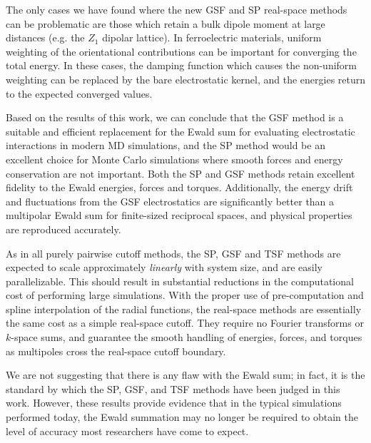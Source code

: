 The only cases we have found where the new GSF and SP real-space
methods can be problematic are those which retain a bulk dipole moment
at large distances (e.g. the $Z_1$ dipolar lattice).  In ferroelectric
materials, uniform weighting of the orientational contributions can be
important for converging the total energy.  In these cases, the
damping function which causes the non-uniform weighting can be
replaced by the bare electrostatic kernel, and the energies return to
the expected converged values.

Based on the results of this work, we can conclude that the GSF method
is a suitable and efficient replacement for the Ewald sum for
evaluating electrostatic interactions in modern MD simulations, and
the SP method would be an excellent choice for Monte Carlo
simulations where smooth forces and energy conservation are not
important.  Both the SP and GSF methods retain excellent fidelity to
the Ewald energies, forces and torques.  Additionally, the energy
drift and fluctuations from the GSF electrostatics are significantly
better than a multipolar Ewald sum for finite-sized reciprocal spaces,
and physical properties are reproduced accurately.

As in all purely pairwise cutoff methods, the SP, GSF and TSF methods
are expected to scale approximately {\it linearly} with system size,
and are easily parallelizable.  This should result in substantial
reductions in the computational cost of performing large simulations.
With the proper use of pre-computation and spline interpolation of the
radial functions, the real-space methods are essentially the same cost
as a simple real-space cutoff.  They require no Fourier transforms or
$k$-space sums, and guarantee the smooth handling of energies, forces,
and torques as multipoles cross the real-space cutoff boundary.

We are not suggesting that there is any flaw with the Ewald sum; in
fact, it is the standard by which the SP, GSF, and TSF methods have
been judged in this work.  However, these results provide evidence
that in the typical simulations performed today, the Ewald summation
may no longer be required to obtain the level of accuracy most
researchers have come to expect.



%
% 
% 
